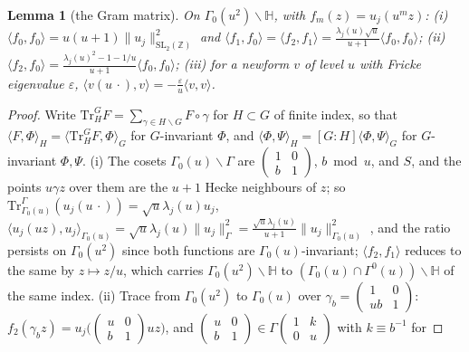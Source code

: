 \documentclass[11pt,a4paper]{article}
\newtheorem{lemma}[theorem]{Lemma}
\theoremstyle{remark}\newtheorem{remark}[theorem]{Remark}
\newcommand{\Z}{\mathbb Z}\newcommand{\R}{\mathbb R}\newcommand{\Q}{\mathbb Q}\newcommand{\HH}{\mathbb H}
\begin{document}
\begin{lemma}[the Gram matrix]\label{lem:gram}
On $\Gamma_0(u^2)\backslash\HH$, with $f_m(z)=u_j(u^mz)$: (i) $\langle f_0,f_0\rangle=u(u+1)\|u_j\|^2_{\mathrm{SL}_2(\Z)}$ and
$\langle f_1,f_0\rangle=\langle f_2,f_1\rangle=\frac{\lambda_j(u)\sqrt u}{u+1}\langle f_0,f_0\rangle$;
(ii) $\langle f_2,f_0\rangle=\frac{\lambda_j(u)^2-1-1/u}{u+1}\langle f_0,f_0\rangle$; (iii) for a newform $v$ of level $u$ with Fricke
eigenvalue $\varepsilon$, $\langle v(u\,\cdot),v\rangle=-\frac\varepsilon u\langle v,v\rangle$.
\end{lemma}
\begin{proof}
Write $\mathrm{Tr}_H^G F=\sum_{\gamma\in H\backslash G}F\circ\gamma$ for $H\subset G$ of finite index, so that
$\langle F,\Phi\rangle_H=\langle\mathrm{Tr}_H^GF,\Phi\rangle_G$ for $G$-invariant $\Phi$, and $\langle\Phi,\Psi\rangle_H=[G:H]\langle\Phi,\Psi\rangle_G$
for $G$-invariant $\Phi,\Psi$. (i) The cosets $\Gamma_0(u)\backslash\Gamma$ are $\left(\begin{smallmatrix}1&0\\ b&1\end{smallmatrix}\right)$,
$b\bmod u$, and $S$, and the points $u\gamma z$ over them are the $u+1$ Hecke neighbours of $z$; so
$\mathrm{Tr}_{\Gamma_0(u)}^\Gamma(u_j(u\,\cdot))=\sqrt u\lambda_j(u)u_j$, $\langle u_j(uz),u_j\rangle_{\Gamma_0(u)}=\sqrt u\lambda_j(u)\|u_j\|^2_\Gamma=
\frac{\sqrt u\lambda_j(u)}{u+1}\|u_j\|^2_{\Gamma_0(u)}$ \cite[Lemma~2.4]{IwaniecLuoSarnak2000}, and the ratio persists on $\Gamma_0(u^2)$
since both functions are $\Gamma_0(u)$-invariant; $\langle f_2,f_1\rangle$ reduces to the same by $z\mapsto z/u$, which carries
$\Gamma_0(u^2)\backslash\HH$ to $(\Gamma_0(u)\cap\Gamma^0(u))\backslash\HH$ of the same index. (ii) Trace from $\Gamma_0(u^2)$ to $\Gamma_0(u)$
over $\gamma_b=\left(\begin{smallmatrix}1&0\\ ub&1\end{smallmatrix}\right)$: $f_2(\gamma_bz)=u_j\bigl(\left(\begin{smallmatrix}u&0\\ b&1\end{smallmatrix}\right)uz\bigr)$,
and $\left(\begin{smallmatrix}u&0\\ b&1\end{smallmatrix}\right)\in\Gamma\left(\begin{smallmatrix}1&k\\0&u\end{smallmatrix}\right)$ with $k\equiv b^{-1}$ for

\end{proof}
\end{document}
